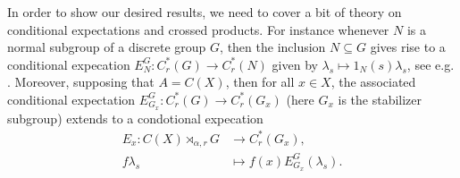 In order to show our desired results, we need to cover a bit of theory on conditional expectations and crossed products. For instance whenever $N$ is a normal subgroup of a discrete group $G$, then the inclusion $N \subseteq G$ gives rise to a conditional expecation $E_{N}^G \colon C_r^*(G) \to C_r^*(N)$ given by $\lambda_s \mapsto 1_{N}(s) \lambda_s$, see e.g. \cite[Corollary 2.5.12]{brown2008c}. Moreover, supposing that $A = C(X)$, then for all $x \in X$, the associated conditional expectation $E_{G_x}^G \colon C_r^* (G) \to C_r^*(G_x)$ (here $G_x$ is the stabilizer subgroup) extends to a condotional expecation
\begin{align}
	E_x \colon C(X) \rtimes_{\alpha,r} G &\to C_r^*(G_x), \\
	f \lambda_s &\mapsto f(x) E_{G_x}^G(\lambda_s).
	\label{eq:stabcond}
\end{align}

